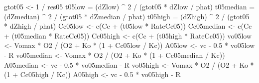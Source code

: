 \documentclass[
]{krantz}
\makeatletter
\newenvironment{Shaded}{\begin{snugshade}}{\end{snugshade}}
\newcommand{\DecValTok}[1]{\textcolor[rgb]{0.00,0.00,0.81}{#1}}
\newcommand{\FloatTok}[1]{\textcolor[rgb]{0.00,0.00,0.81}{#1}}
\newcommand{\FunctionTok}[1]{\textcolor[rgb]{0.00,0.00,0.00}{#1}}
\newcommand{\NormalTok}[1]{#1}
\newcommand{\OtherTok}[1]{\textcolor[rgb]{0.56,0.35,0.01}{#1}}
\newcommand{\SpecialCharTok}[1]{\textcolor[rgb]{0.00,0.00,0.00}{#1}}
\newenvironment{kframe}{%
\medskip{}
\setlength{\fboxsep}{.8em}
 \def\at@end@of@kframe{}%
 \ifinner\ifhmode%
  \def\at@end@of@kframe{\end{minipage}}%
  \begin{minipage}{\columnwidth}%
 \fi\fi%
 \def\FrameCommand##1{\hskip\@totalleftmargin \hskip-\fboxsep
 \colorbox{shadecolor}{##1}\hskip-\fboxsep
     \hskip-\linewidth \hskip-\@totalleftmargin \hskip\columnwidth}%
 \MakeFramed {\advance\hsize-\width
   \@totalleftmargin\z@ \linewidth\hsize
   \@setminipage}}%
 {\par\unskip\endMakeFramed%
 \at@end@of@kframe}
\renewenvironment{Shaded}{\begin{kframe}}{\end{kframe}}
\makeatother
\begin{document}
\begin{Shaded}
\begin{Highlighting}[]
\NormalTok{gtot05 }\OtherTok{\textless{}{-}} \DecValTok{1} \SpecialCharTok{/}\NormalTok{ res05}
\NormalTok{t05low }\OtherTok{=}\NormalTok{ (dZlow) }\SpecialCharTok{\^{}} \DecValTok{2} \SpecialCharTok{/}\NormalTok{ (gtot05 }\SpecialCharTok{*}\NormalTok{ dZlow }\SpecialCharTok{/}\NormalTok{ phat)}
\NormalTok{t05median }\OtherTok{=}\NormalTok{ (dZmedian) }\SpecialCharTok{\^{}} \DecValTok{2} \SpecialCharTok{/}\NormalTok{ (gtot05 }\SpecialCharTok{*}\NormalTok{ dZmedian }\SpecialCharTok{/}\NormalTok{ phat)}
\NormalTok{t05high }\OtherTok{=}\NormalTok{ (dZhigh) }\SpecialCharTok{\^{}} \DecValTok{2} \SpecialCharTok{/}\NormalTok{ (gtot05 }\SpecialCharTok{*}\NormalTok{ dZhigh }\SpecialCharTok{/}\NormalTok{ phat)}
\NormalTok{Cc05low }\OtherTok{\textless{}{-}} \FunctionTok{c}\NormalTok{(Cc }\SpecialCharTok{+}\NormalTok{ (t05low }\SpecialCharTok{*}\NormalTok{ RateCc05))}
\NormalTok{Cc05median }\OtherTok{\textless{}{-}} \FunctionTok{c}\NormalTok{(Cc }\SpecialCharTok{+}\NormalTok{ (t05median }\SpecialCharTok{*}\NormalTok{ RateCc05))}
\NormalTok{Cc05high }\OtherTok{\textless{}{-}} \FunctionTok{c}\NormalTok{(Cc }\SpecialCharTok{+}\NormalTok{ (t05high }\SpecialCharTok{*}\NormalTok{ RateCc05))}
\NormalTok{vo05low }\OtherTok{\textless{}{-}}\NormalTok{ Vomax }\SpecialCharTok{*}\NormalTok{ O2 }\SpecialCharTok{/}\NormalTok{ (O2 }\SpecialCharTok{+}\NormalTok{ Ko }\SpecialCharTok{*}\NormalTok{ (}\DecValTok{1} \SpecialCharTok{+}\NormalTok{ Cc05low }\SpecialCharTok{/}\NormalTok{ Kc)) }
\NormalTok{A05low }\OtherTok{\textless{}{-}}\NormalTok{ vc }\SpecialCharTok{{-}} \FloatTok{0.5} \SpecialCharTok{*}\NormalTok{ vo05low }\SpecialCharTok{{-}}\NormalTok{ R }
\NormalTok{vo05median }\OtherTok{\textless{}{-}}\NormalTok{ Vomax }\SpecialCharTok{*}\NormalTok{ O2 }\SpecialCharTok{/}\NormalTok{ (O2 }\SpecialCharTok{+}\NormalTok{ Ko }\SpecialCharTok{*}\NormalTok{ (}\DecValTok{1} \SpecialCharTok{+}\NormalTok{ Cc05median }\SpecialCharTok{/}\NormalTok{ Kc)) }
\NormalTok{A05median }\OtherTok{\textless{}{-}}\NormalTok{ vc }\SpecialCharTok{{-}} \FloatTok{0.5} \SpecialCharTok{*}\NormalTok{ vo05median }\SpecialCharTok{{-}}\NormalTok{ R }
\NormalTok{vo05high }\OtherTok{\textless{}{-}}\NormalTok{ Vomax }\SpecialCharTok{*}\NormalTok{ O2 }\SpecialCharTok{/}\NormalTok{ (O2 }\SpecialCharTok{+}\NormalTok{ Ko }\SpecialCharTok{*}\NormalTok{ (}\DecValTok{1} \SpecialCharTok{+}\NormalTok{ Cc05high }\SpecialCharTok{/}\NormalTok{ Kc)) }
\NormalTok{A05high }\OtherTok{\textless{}{-}}\NormalTok{ vc }\SpecialCharTok{{-}} \FloatTok{0.5} \SpecialCharTok{*}\NormalTok{ vo05high }\SpecialCharTok{{-}}\NormalTok{ R }


\end{Highlighting}
\end{Shaded}
\end{document}
